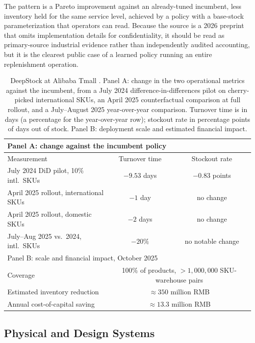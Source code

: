 The pattern is a Pareto improvement against an already-tuned incumbent, less inventory held for the same service level, achieved by a policy with a base-stock parameterization that operators can read. Because the source is a 2026 preprint that omits implementation details for confidentiality, it should be read as primary-source industrial evidence rather than independently audited accounting, but it is the clearest public case of a learned policy running an entire replenishment operation.

\begin{table}[t]
\centering
\small
\begin{tabular}{lcc}
\toprule
\multicolumn{3}{l}{Panel A: change against the incumbent policy} \\
\midrule
Measurement & Turnover time & Stockout rate \\
\midrule
July 2024 DiD pilot, 10\% intl.\ SKUs & $-9.53$ days & $-0.83$ points \\
April 2025 rollout, international SKUs & $-1$ day & no change \\
April 2025 rollout, domestic SKUs & $-2$ days & no change \\
July--Aug 2025 vs.\ 2024, intl.\ SKUs & $-20\%$ & no notable change \\
\midrule
\multicolumn{3}{l}{Panel B: scale and financial impact, October 2025} \\
\midrule
Coverage & \multicolumn{2}{c}{100\% of products, $>\!1{,}000{,}000$ SKU-warehouse pairs} \\
Estimated inventory reduction & \multicolumn{2}{c}{$\approx 350$ million RMB} \\
Annual cost-of-capital saving & \multicolumn{2}{c}{$\approx 13.3$ million RMB} \\
\bottomrule
\end{tabular}
\caption{DeepStock at Alibaba Tmall \citep{Xie2026DeepStock}. Panel A: change in the two operational metrics against the incumbent, from a July 2024 difference-in-differences pilot on cherry-picked international SKUs, an April 2025 counterfactual comparison at full rollout, and a July--August 2025 year-over-year comparison. Turnover time is in days (a percentage for the year-over-year row); stockout rate in percentage points of days out of stock. Panel B: deployment scale and estimated financial impact.}
\label{tab:deepstock_results}
\end{table}

\subsection{Physical and Design Systems}


